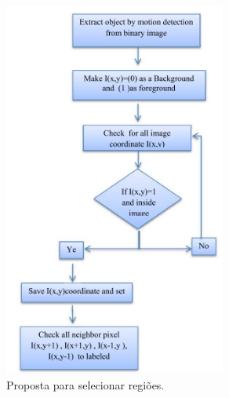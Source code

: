\documentclass{beamer}
\begin{document}

\begin{frame}{}
	\begin{columns}
		\begin{column}{0.40\textwidth}
			\begin{figure}[H]
				\centering
				\begin{center}
				\includegraphics[width=0.65\textwidth]{img/fig5-artigo9.png}
				\caption{Proposta para selecionar regiões.}
				\label{fig:sar}
				\end{center}
			\end{figure}
		\end{column}
	

\end{columns}
\end{frame}
\end{document}
